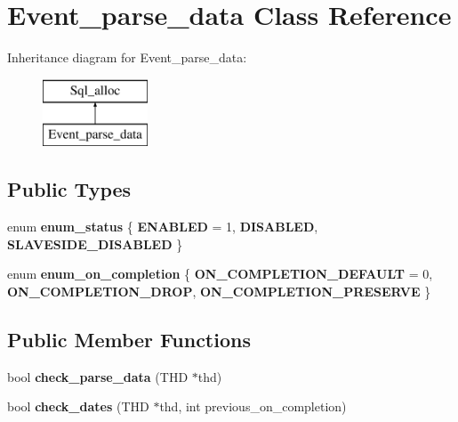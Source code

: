 \hypertarget{classEvent__parse__data}{}\section{Event\+\_\+parse\+\_\+data Class Reference}
\label{classEvent__parse__data}
Inheritance diagram for Event\+\_\+parse\+\_\+data\+:\begin{figure}[H]
\begin{center}
\leavevmode
\includegraphics[height=2.000000cm]{classEvent__parse__data}
\end{center}
\end{figure}
\subsection*{Public Types}
\begin{DoxyCompactItemize}
\item 
\mbox{\label{classEvent__parse__data_aca28ec764396822b09cbbb3c8d38ce81}} 
enum {\bfseries enum\+\_\+status} \{ {\bfseries E\+N\+A\+B\+L\+ED} = 1, 
{\bfseries D\+I\+S\+A\+B\+L\+ED}, 
{\bfseries S\+L\+A\+V\+E\+S\+I\+D\+E\+\_\+\+D\+I\+S\+A\+B\+L\+ED}
 \}
\item 
\mbox{\label{classEvent__parse__data_adf8dccdbb7ce5bda0c7e66de9cf012a0}} 
enum {\bfseries enum\+\_\+on\+\_\+completion} \{ {\bfseries O\+N\+\_\+\+C\+O\+M\+P\+L\+E\+T\+I\+O\+N\+\_\+\+D\+E\+F\+A\+U\+LT} = 0, 
{\bfseries O\+N\+\_\+\+C\+O\+M\+P\+L\+E\+T\+I\+O\+N\+\_\+\+D\+R\+OP}, 
{\bfseries O\+N\+\_\+\+C\+O\+M\+P\+L\+E\+T\+I\+O\+N\+\_\+\+P\+R\+E\+S\+E\+R\+VE}
 \}
\end{DoxyCompactItemize}
\subsection*{Public Member Functions}
\begin{DoxyCompactItemize}
\item 
\mbox{\label{classEvent__parse__data_a1b26141d2af6a452d4a979d82b1243fe}} 
bool {\bfseries check\+\_\+parse\+\_\+data} (T\+HD $\ast$thd)
\item 
\mbox{\label{classEvent__parse__data_a1b9c0105c20cef8d425a1e454308df1d}} 
bool {\bfseries check\+\_\+dates} (T\+HD $\ast$thd, int previous\+\_\+on\+\_\+completion)
\end{DoxyCompactItemize}
